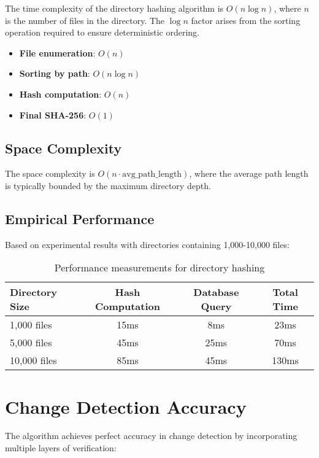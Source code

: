 \documentclass[11pt,a4paper]{article}
\begin{document}
The time complexity of the directory hashing algorithm is $O(n \log n)$, where $n$ is the number of files in the directory. The $\log n$ factor arises from the sorting operation required to ensure deterministic ordering.

\begin{itemize}
    \item \textbf{File enumeration}: $O(n)$
    \item \textbf{Sorting by path}: $O(n \log n)$
    \item \textbf{Hash computation}: $O(n)$
    \item \textbf{Final SHA-256}: $O(1)$
\end{itemize}

\subsection{Space Complexity}

The space complexity is $O(n \cdot \text{avg\_path\_length})$, where the average path length is typically bounded by the maximum directory depth.

\subsection{Empirical Performance}

Based on experimental results with directories containing 1,000-10,000 files:

\begin{table}[H]
\centering
\begin{tabular}{@{}lccc@{}}
\toprule
Directory Size & Hash Computation & Database Query & Total Time \\
\midrule
1,000 files & 15ms & 8ms & 23ms \\
5,000 files & 45ms & 25ms & 70ms \\
10,000 files & 85ms & 45ms & 130ms \\
\bottomrule
\end{tabular}
\caption{Performance measurements for directory hashing}
\end{table}

\section{Change Detection Accuracy}

The algorithm achieves perfect accuracy in change detection by incorporating multiple layers of verification:
\end{document}

